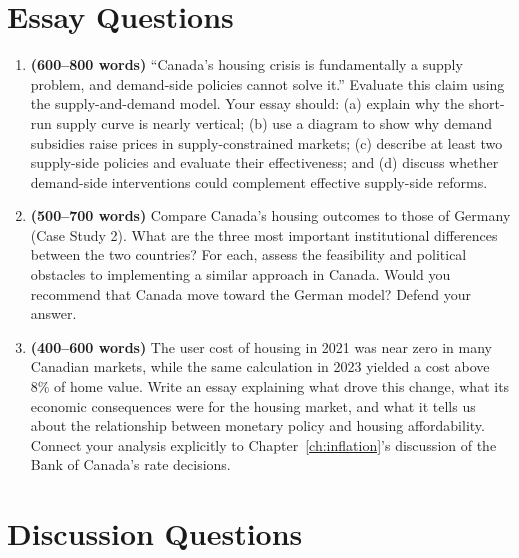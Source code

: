 \section*{Essay Questions}

\begin{enumerate}

\item \textbf{(600--800 words)} ``Canada's housing crisis is fundamentally
a supply problem, and demand-side policies cannot solve it.'' Evaluate this
claim using the supply-and-demand model. Your essay should: (a) explain
why the short-run supply curve is nearly vertical; (b) use a diagram to
show why demand subsidies raise prices in supply-constrained markets;
(c) describe at least two supply-side policies and evaluate their
effectiveness; and (d) discuss whether demand-side interventions could
complement effective supply-side reforms.

\item \textbf{(500--700 words)} Compare Canada's housing outcomes to those
of Germany (Case Study 2). What are the three most important institutional
differences between the two countries? For each, assess the feasibility and
political obstacles to implementing a similar approach in Canada. Would you
recommend that Canada move toward the German model? Defend your answer.

\item \textbf{(400--600 words)} The user cost of housing in 2021 was near
zero in many Canadian markets, while the same calculation in 2023 yielded
a cost above 8\% of home value. Write an essay explaining what drove this
change, what its economic consequences were for the housing market, and
what it tells us about the relationship between monetary policy and housing
affordability. Connect your analysis explicitly to Chapter~\ref{ch:inflation}'s
discussion of the Bank of Canada's rate decisions.

\end{enumerate}

\section*{Discussion Questions}

